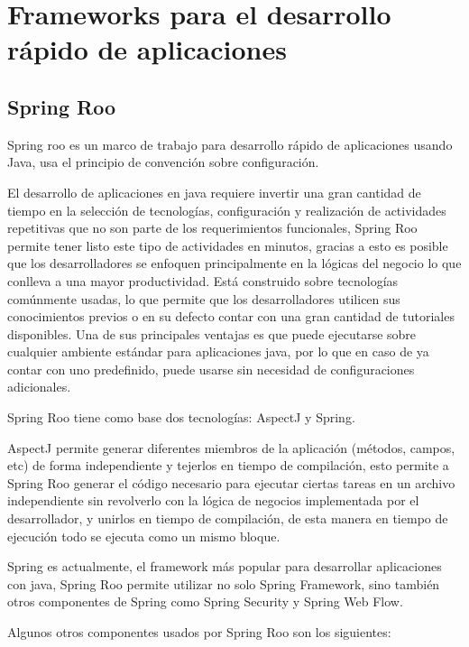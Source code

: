 \documentclass[12pt,a4paper,spanish,openany]{book}
\begin{document}
\section{Frameworks para el desarrollo rápido de aplicaciones}

\subsection{Spring Roo}

Spring roo es un marco de trabajo para desarrollo rápido de aplicaciones
usando Java, usa el principio de convención sobre configuración.

El desarrollo de aplicaciones en java requiere invertir una gran cantidad de
tiempo en la selección de tecnologías, configuración y realización de
actividades repetitivas que no son parte de los requerimientos funcionales,
Spring Roo permite tener listo este tipo de actividades en minutos, gracias a
esto es posible que los desarrolladores se enfoquen principalmente en la
lógicas del negocio lo que conlleva a una mayor productividad.
Está construido sobre tecnologías comúnmente usadas, lo que permite que los
desarrolladores utilicen sus conocimientos previos o en su defecto contar con
una gran cantidad de tutoriales disponibles.
Una de sus principales ventajas es que puede ejecutarse sobre cualquier ambiente
estándar para aplicaciones java, por lo que en caso de ya contar con uno
predefinido, puede usarse sin necesidad de configuraciones adicionales.

Spring Roo tiene como base dos tecnologías: AspectJ y Spring.

AspectJ permite generar diferentes miembros de la aplicación (métodos, campos,
etc) de forma independiente y tejerlos en tiempo de compilación, esto permite
a Spring Roo generar el código necesario para ejecutar ciertas tareas en un
archivo independiente sin revolverlo con la lógica de negocios implementada por
el desarrollador, y unirlos en tiempo de compilación,
de esta manera en tiempo de ejecución todo se ejecuta como un mismo
bloque. 

Spring es actualmente, el framework más popular para desarrollar aplicaciones
con java, Spring Roo permite utilizar no solo Spring Framework, sino también
otros componentes de Spring como Spring Security y Spring Web Flow.

Algunos otros componentes usados por Spring Roo son los siguientes:
\end{document}
